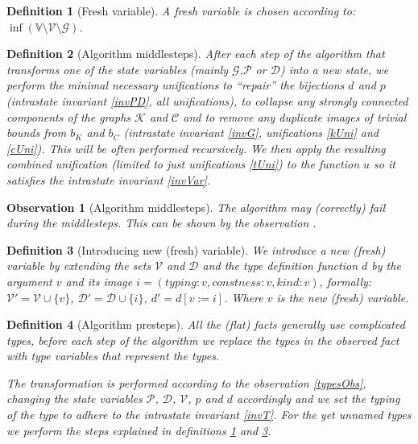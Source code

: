 \documentclass[12pt,a4paper]{article}
\newtheorem{definition}{Definition}
\newtheorem{observation}{Observation}
\begin{document}
\begin{definition}[Fresh variable]
    \label{freshVar}
    A fresh variable is chosen according to: \linebreak $\inf \left(\mathbb{V} \setminus \mathcal{V} \setminus \mathcal{G}\right)$.
\end{definition}

\begin{definition}[Algorithm middlesteps]
    \label{middlesteps}
    After each step of the algorithm that transforms one of the state variables (mainly $\mathcal{G}$,$\mathcal{P}$ or $\mathcal{D}$) into a new state, we perform the minimal necessary unifications to ``repair'' the bijections $d$ and $p$ (intrastate invariant \ref{invPD}, all unifications), to collapse any strongly connected components of the graphs $\mathcal{K}$ and  $\mathcal{C}$ and to remove any duplicate images of trivial bounds from $b_K$ and $b_C$ (intrastate invariant \ref{invG}, unifications \ref{kUni} and \ref{cUni}). This will be often performed recursively. We then apply the resulting combined unification (limited to just unifications \ref{tUni}) to the function $u$ so it satisfies the intrastate invariant \ref{invVar}. %
\end{definition}

\begin{observation}[Algorithm middlesteps]
    The algorithm may (correctly) fail during the middlesteps. This can be shown by the observation .
\end{observation}

\begin{definition}[Introducing new (fresh) variable]
    \label{introVar}
    We introduce a new (fresh) variable by extending the sets $\mathcal{V}$ and $\mathcal{D}$
    and the type definition function $d$ by the argument $v$ and its image $i = (typing: v, constness: v, kind: v)$, formally: $\mathcal{V}' = \mathcal{V} \cup \{v\}$, $\mathcal{D}' = \mathcal{D} \cup \{i\}$, $d' = d [v := i]$. Where $v$ is the new (fresh) variable.
\end{definition}
\begin{definition}[Algorithm presteps]
    \label{presteps}
    All the (flat) facts generally use complicated types, before each step of the algorithm we replace the types in the observed fact with type variables that represent the types.

    The transformation is performed according to the observation \ref{typesObs}, changing the state variables $\mathcal{P}$, $\mathcal{D}$, $\mathcal{V}$, $p$ and $d$ accordingly and we set the typing of the type to adhere to the intrastate invariant \ref{invT}. For the yet unnamed types we perform the steps explained in definitions \ref{freshVar} and \ref{introVar}.
\end{definition}
\end{document}
